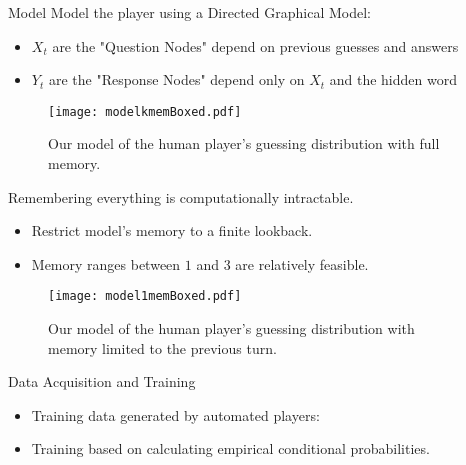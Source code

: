 \documentclass[final]{beamer}
\begin{document}
{\begin{frame}{}
\begin{center}
\begin{columns}[t]
\begin{column}{0.32\textwidth}
    \begin{block}{\huge Model}
\vspace{.5cm}
{\Large Model the player using a Directed Graphical Model:}
\begin{itemize}
\item $X_t$ are the "Question Nodes" depend on previous guesses and answers
\item $Y_t$ are the "Response Nodes" depend only on $X_t$ and the hidden word
\end{itemize}
\begin{figure}
\texttt{[image: modelkmemBoxed.pdf]}
\caption{Our model of the human player's guessing distribution with full memory.}
\end{figure}
{\Large Remembering everything is computationally intractable.}
\begin{itemize}
\item Restrict model's memory to a finite lookback.
\item Memory ranges between $1$ and $3$ are relatively feasible. 
\end{itemize}
\begin{figure}
\texttt{[image: model1memBoxed.pdf]}
\caption{Our model of the human player's guessing distribution with memory limited to the previous turn.}
\end{figure}
    \end{block}
\vspace{1.2cm}
    \begin{block}{\huge Data Acquisition and Training}
\vspace{.5cm}

\begin{itemize}
\item Training data generated by automated players:
\item Training based on calculating empirical conditional probabilities.
\end{itemize}

    \end{block}
   
\end{column}

\begin{column}{0.32\textwidth}
 

\end{column}
\end{columns}
\end{center}
\end{frame}}
\end{document}
